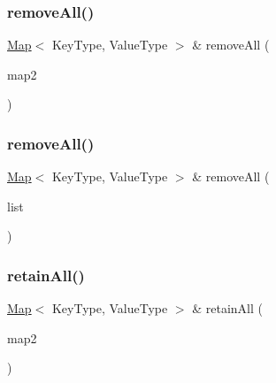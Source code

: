 \mbox{\label{classMap_aef8a9fb79f29126a485f697c3069801c}} 
\subsubsection{\texorpdfstring{remove\+All()}{removeAll()}\hspace{0.1cm}{\footnotesize\ttfamily [1/2]}}
{\footnotesize\ttfamily \mbox{\hyperlink{classMap}{Map}}$<$ Key\+Type, Value\+Type $>$ \& remove\+All (\begin{DoxyParamCaption}\item[{const \mbox{\hyperlink{classMap}{Map}}$<$ Key\+Type, Value\+Type $>$ \&}]{map2 }\end{DoxyParamCaption})}

\mbox{\label{classMap_a137a0bba581f8406f9859cf949536510}} 
\subsubsection{\texorpdfstring{remove\+All()}{removeAll()}\hspace{0.1cm}{\footnotesize\ttfamily [2/2]}}
{\footnotesize\ttfamily \mbox{\hyperlink{classMap}{Map}}$<$ Key\+Type, Value\+Type $>$ \& remove\+All (\begin{DoxyParamCaption}\item[{std\+::initializer\+\_\+list$<$ std\+::pair$<$ Key\+Type, Value\+Type $>$ $>$}]{list }\end{DoxyParamCaption})}

\mbox{\label{classMap_abe07b84e7c8050870da86c3d2005f3bb}} 
\subsubsection{\texorpdfstring{retain\+All()}{retainAll()}\hspace{0.1cm}{\footnotesize\ttfamily [1/2]}}
{\footnotesize\ttfamily \mbox{\hyperlink{classMap}{Map}}$<$ Key\+Type, Value\+Type $>$ \& retain\+All (\begin{DoxyParamCaption}\item[{const \mbox{\hyperlink{classMap}{Map}}$<$ Key\+Type, Value\+Type $>$ \&}]{map2 }\end{DoxyParamCaption})}

